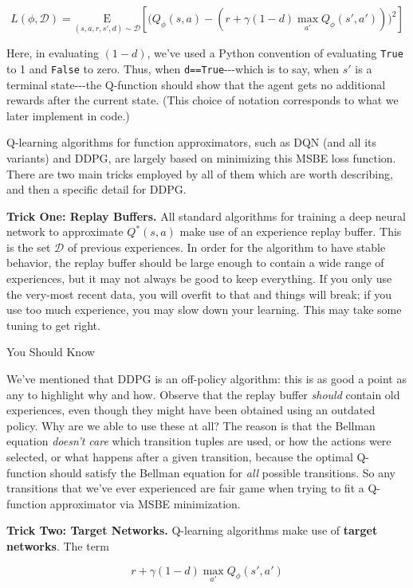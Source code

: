 \[L(\phi, {\mathcal D}) = \underset{(s,a,r,s',d) \sim {\mathcal D}}{{\mathrm E}}\left[
    \Bigg( Q_{\phi}(s,a) - \left(r + \gamma (1 - d) \max_{a'} Q_{\phi}(s',a') \right) \Bigg)^2
    \right]\]

Here, in evaluating \((1-d)\), we've used a Python convention of
evaluating \texttt{True} to 1 and \texttt{False} to zero. Thus, when
\texttt{d==True}-\/-\/-which is to say, when \(s'\) is a terminal
state-\/-\/-the Q-function should show that the agent gets no additional
rewards after the current state. (This choice of notation corresponds to
what we later implement in code.)

Q-learning algorithms for function approximators, such as DQN (and all
its variants) and DDPG, are largely based on minimizing this MSBE loss
function. There are two main tricks employed by all of them which are
worth describing, and then a specific detail for DDPG.

\textbf{Trick One: Replay Buffers.} All standard algorithms for training
a deep neural network to approximate \(Q^*(s,a)\) make use of an
experience replay buffer. This is the set \({\mathcal D}\) of previous
experiences. In order for the algorithm to have stable behavior, the
replay buffer should be large enough to contain a wide range of
experiences, but it may not always be good to keep everything. If you
only use the very-most recent data, you will overfit to that and things
will break; if you use too much experience, you may slow down your
learning. This may take some tuning to get right.

You Should Know

We've mentioned that DDPG is an off-policy algorithm: this is as good a
point as any to highlight why and how. Observe that the replay buffer
\emph{should} contain old experiences, even though they might have been
obtained using an outdated policy. Why are we able to use these at all?
The reason is that the Bellman equation \emph{doesn't care} which
transition tuples are used, or how the actions were selected, or what
happens after a given transition, because the optimal Q-function should
satisfy the Bellman equation for \emph{all} possible transitions. So any
transitions that we've ever experienced are fair game when trying to fit
a Q-function approximator via MSBE minimization.

\textbf{Trick Two: Target Networks.} Q-learning algorithms make use of
\textbf{target networks}. The term

\[r + \gamma (1 - d) \max_{a'} Q_{\phi}(s',a')\]

